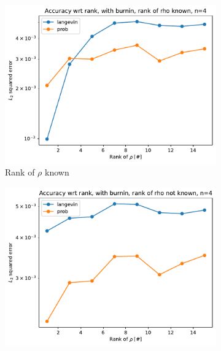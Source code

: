 \documentclass[12pt]{memoir}
\begin{document}
\begin{figure}[H]

    \centering

    \begin{subfigure}[b]{0.49\textwidth}


        \centering

        \includegraphics[width=\textwidth]{figures/experiments/rank_info/rank_known_n4-1.png}

        \caption{Rank of $\rho$ known}

        \label{fig:rank-info-n4-sub}

    \end{subfigure}
    \hfill
    \begin{subfigure}[b]{0.49\textwidth}


        \centering

        \includegraphics[width=\textwidth]{figures/experiments/rank_info/rank_not_known_n4-1.png}


\end{subfigure}
\end{figure}
\end{document}
